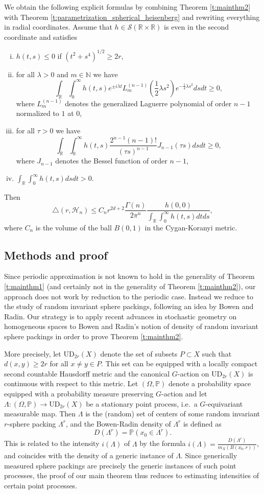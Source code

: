 \documentclass[12pt,reqno,a4paper]{amsart}
\theoremstyle{theorem}
\theoremstyle{definition}
\numberwithin{theorem}{section}
\numberwithin{equation}{section}
\newcommand{\R}{\mathbb{R}}
\newcommand{\N}{\mathbb{N}}
\newcommand{\UD}{\mathrm{UD}}
\begin{document}
	We obtain the following explicit formulas by combining Theorem \ref{t:mainthm2} with Theorem \ref{t:parametrization_spherical_heisenberg} and rewriting everything in radial coordinates.
	Assume that $h\in \mathscr{S}(\R\times \R)$ is even in the second coordinate and satisfies
	\begin{enumerate}[(i)]
		\item $h(t,s)\leq 0$ if $(t^2+s^4)^{1/2}\geq 2r$,
		\item for all $\lambda>0$ and $m\in \N$ we have 
		\[\int_\R\int_0^\infty h(t,s)e^{\pm i\lambda t}L_{m}^{(n-1)}\left(\frac{1}{2}\lambda s^2\right)e^{-\frac{1}{4}\lambda s^2}dsdt\geq 0,\]
		where $L_m^{(n-1)}$ denotes the generalized Laguerre polynomial of order $n-1$ normalized to $1$ at $0$,
		\item for all $\tau>0$ we have
		\[\int_\R\int_0^\infty h(t,s)\frac{2^{n-1}(n-1)!}{(\tau s)^{n-1}}J_{n-1}(\tau s)dsdt\geq 0,\]
		where $J_{n-1}$ denotes the Bessel function of order $n-1$,
		\item $\int_\R\int_0^\infty h(t,s)dsdt>0$.
	\end{enumerate}
	Then
	\[\triangle(r,\mathcal{H}_n) \leq C_nr^{2d+2}\frac{\Gamma(n)}{2\pi^n}\frac{h(0,0)}{\int_\R\int_0^\infty h(t,s)dtds},\]
	where $C_n$ is the volume of the ball $B(0,1)$ in the Cygan-Koranyi metric.

\subsection{Methods and proof}

Since periodic approximation is not known to hold in the generality of Theorem \ref{t:mainthm1} (and certainly not in the generality of Theorem \ref{t:mainthm2}), our approach does not work by reduction to the periodic case. Instead we reduce to the study of random invariant sphere packings, following an idea by Bowen and Radin. Our strategy is to apply recent advances in stochastic geometry on homogeneous spaces to Bowen and Radin's notion of density of random invariant sphere packings in order to prove Theorem \ref{t:mainthm2}.

More precisely, let $\UD_{2r}(X)$ denote the set of subsets $P\subset X$ such that $d(x,y)\geq 2r$ for all $x\neq y\in P$. This set can be equipped with a locally compact second countable Hausdorff metric and the canonical $G$-action on $\UD_{2r}(X)$ is continuous with respect to this metric. Let $(\Omega,\mathbb{P})$ denote a probability space equipped with a probability measure preserving $G$-action and let $\Lambda:(\Omega,\mathbb{P})\to \UD_{2r}(X)$ be a stationary point process, i.e.\ a $G$-equivariant measurable map. Then $\Lambda$ is the (random) set of centers of some random invariant $r$-sphere packing $\Lambda^r$, and the Bowen-Radin density of $\Lambda^r$ is defined as \[D(\Lambda^r) = \mathbb{P}(x_0\in \Lambda^r).\] This is related to the intensity $i(\Lambda)$ of $\Lambda$ by the formula $i(\Lambda)= \frac{D(\Lambda^r)}{m_X(B(x_0,r))}$, and coincides with the density of a generic instance of $\Lambda$. Since generically measured sphere packings are precisely the generic instances of such point processes, the proof of our main theorem thus reduces to estimating intensities of certain point processes.
\end{document}

